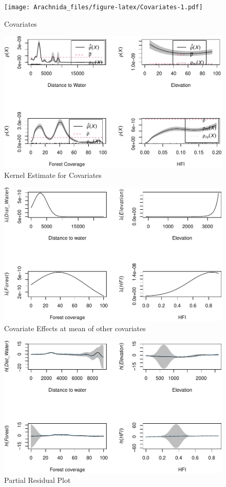 \documentclass{article}
\begin{document}
\begin{figure}
\centering
\texttt{[image: Arachnida\_files/figure-latex/Covariates-1.pdf]}
\caption{\label{fig:covariates}Covariates}
\end{figure}

\begin{figure}
\centering
\includegraphics{Arachnida_files/figure-latex/Covariates.rela.fig-1.pdf}
\caption{\label{fig:CovKernek}Kernel Estimate for Covariates}
\end{figure}

\begin{figure}
\centering
\includegraphics{Arachnida_files/figure-latex/ppm.effect-1.pdf}
\caption{\label{fig:effect} Covariate Effects at mean of other
covariates}
\end{figure}

\begin{figure}
\centering
\includegraphics{Arachnida_files/figure-latex/res-1.pdf}
\caption{\label{fig:ResKernel}Partial Residual Plot}
\end{figure}



\end{document}
